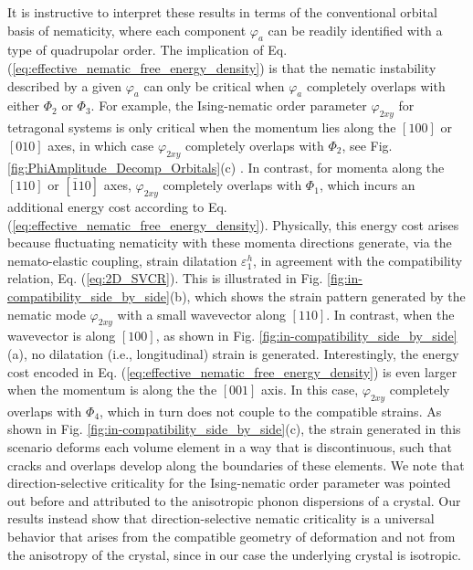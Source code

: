 \documentclass[aps,prb, twocolumn, superscriptaddress, amsmath, amsfonts, amssymb, amsthm]{revtex4-2}
\renewcommand{\eqref}[1]{Eq. (\ref{#1})}
\begin{document}
It is instructive to interpret these results in terms of the conventional orbital basis of nematicity, where each component $\varphi_a$ can be readily identified with a type of quadrupolar order. The implication  of \eqref{eq:effective_nematic_free_energy_density} is that the nematic instability described by a given  $\varphi_a$ can only be critical  when $\varphi_a$  completely overlaps with either $\Phi_2$  or $\Phi_3$. For example, the Ising-nematic order parameter $\varphi_{2xy}$ for tetragonal systems is only critical when the momentum lies along the $[100]$ or $[010]$  axes, in which case  $\varphi_{2xy}$ completely overlaps with $\Phi_2$, see  Fig. \ref{fig:PhiAmplitude_Decomp_Orbitals}(c) . In contrast, for momenta along the $[110]$ or $[\bar{1}10]$  axes,   $\varphi_{2xy}$ completely overlaps with $\Phi_1$, which incurs an additional energy cost according to  \eqref{eq:effective_nematic_free_energy_density}. Physically, this energy cost arises because fluctuating nematicity with these momenta directions generate, via the nemato-elastic coupling,  strain dilatation $\varepsilon^h_1$, in agreement with the compatibility relation, \eqref{eq:2D_SVCR}.  This is illustrated in  Fig. \ref{fig:in-compatibility_side_by_side}(b), which shows the strain pattern generated by the nematic mode $\varphi_{2xy}$ with a small wavevector along  $[110]$. In contrast, when the wavevector is along  $[100]$, as shown in  Fig. \ref{fig:in-compatibility_side_by_side}(a), no dilatation (i.e., longitudinal) strain is generated. Interestingly, the energy cost encoded in  \eqref{eq:effective_nematic_free_energy_density} is even larger when the momentum is along the  the $[001]$ axis. In this case,  $\varphi_{2xy}$  completely overlaps with  $\Phi_4$, which in turn does not couple to the compatible strains. As shown in Fig. \ref{fig:in-compatibility_side_by_side}(c), the strain generated in this scenario deforms each volume element in a way that is discontinuous, such that cracks and overlaps develop along the boundaries of these elements.  We note that direction-selective criticality for the Ising-nematic order parameter was pointed out before \cite{Karahasanovic16,Paul17} and attributed to the anisotropic phonon dispersions of a crystal. Our results instead show that direction-selective nematic criticality is a universal behavior that arises from the compatible geometry of deformation and not from the anisotropy of the crystal, since in our case the underlying crystal is isotropic.
\end{document}
